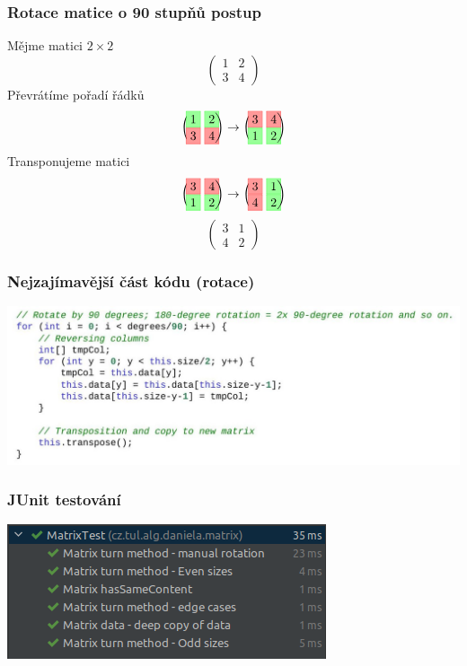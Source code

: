 \documentclass{beamer}
\newcommand{\rlight}[1]{%
    \ooalign{\hss\makebox[0pt]{\fcolorbox{red!80}{red!40}{$#1$}}\hss\cr\phantom{$#1$}}%
}
\newcommand{\glight}[1]{%
    \ooalign{\hss\makebox[0pt]{\fcolorbox{green!80}{green!40}{$#1$}}\hss\cr\phantom{$#1$}}%
}
\begin{document}
\begin{frame}
    \frametitle{Rotace matice o 90 stupňů \small{postup}}
    Mějme matici $2\times2$
    \[
    \begin{pmatrix}
        1 & 2\\
        3 & 4
    \end{pmatrix}
    \]
    Převrátíme pořadí řádků
    \[
    \begin{pmatrix}
        \glight{1} & \glight{2}\\
        \rlight{3} & \rlight{4}
    \end{pmatrix}
    \rightarrow
    \begin{pmatrix}
        \rlight{3} & \rlight{4}\\
        \glight{1} & \glight{2}
    \end{pmatrix}
    \]
    Transponujeme matici
    \[
    \begin{pmatrix}
        \rlight{3} & \rlight{4}\\
        \glight{1} & \glight{2}
    \end{pmatrix}
    \rightarrow
    \begin{pmatrix}
        \rlight{3} & \glight{1}\\
        \rlight{4} & \glight{2}
    \end{pmatrix}
    \]
    \[
    \begin{pmatrix}
        3 & 1\\
        4 & 2
    \end{pmatrix}
    \]
\end{frame}
\begin{frame}
\frametitle{Nejzajímavější část kódu (rotace)}
\includegraphics[scale=0.25]{java-code}

\end{frame}
\begin{frame}
    \frametitle{JUnit testování}
    \includegraphics[scale=0.6]{alg1-unit-tests}
\end{frame}
\end{document}
